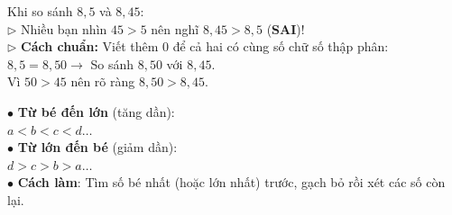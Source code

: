 \documentclass[14pt,a4paper,oneside]{extbook}
\begin{document}
\noindent
\begin{minipage}[t]{0.52\textwidth}
  \begin{tcolorbox}[
    enhanced,
    title={\footnotesize\bfseries\color{white}\faBolt\ 2. Mẹo thêm số 0 tránh nhầm lẫn},
    colback=teal!2!white,
    colframe=teal!75!black,
    arc=2.5mm, boxrule=0.8pt, top=1.8mm, bottom=1.8mm, left=2.2mm, right=2.2mm
  ]
    \footnotesize
    Khi so sánh $8,5$ và $8,45$:\\
    $\triangleright$ Nhiều bạn nhìn $45 > 5$ nên nghĩ $8,45 > 8,5$ (\textbf{SAI})!\\
    $\triangleright$ \textbf{Cách chuẩn:} Viết thêm $0$ để cả hai có cùng số chữ số thập phân:\\
    \quad $8,5 = 8,50 \longrightarrow$ So sánh $8,50$ với $8,45$.\\
    \quad Vì $50 > 45$ nên rõ ràng $8,50 > 8,45$.
  \end{tcolorbox}
\end{minipage}%
\hfill
\begin{minipage}[t]{0.46\textwidth}
  \begin{tcolorbox}[
    enhanced,
    title={\footnotesize\bfseries\color{white}\faSortAmountAsc\ 3. Sắp xếp thứ tự},
    colback=purple!2!white,
    colframe=purple!70!black,
    arc=2.5mm, boxrule=0.8pt, top=1.8mm, bottom=1.8mm, left=2mm, right=2mm
  ]
    \footnotesize
    $\bullet$ \textbf{Từ bé đến lớn} (tăng dần):\\
    \quad $a < b < c < d\dots$\\
    $\bullet$ \textbf{Từ lớn đến bé} (giảm dần):\\
    \quad $d > c > b > a\dots$\\
    $\bullet$ \textbf{Cách làm}: Tìm số bé nhất (hoặc lớn nhất) trước, gạch bỏ rồi xét các số còn lại.
  \end{tcolorbox}
\end{minipage}

\vspace{3mm}
\end{document}
